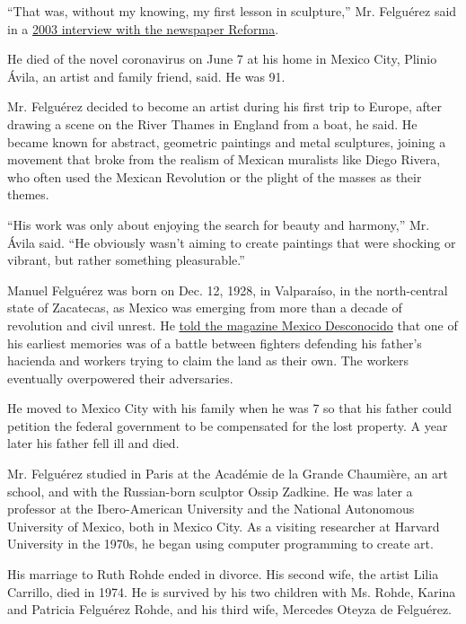 ``That was, without my knowing, my first lesson in sculpture,'' Mr.
Felguérez said in a
\href{https://reforma.vlex.com.mx/vid/manuel-felguerez-contrapesos-tension-82014611}{2003
interview with the newspaper Reforma}.

He died of the novel coronavirus on June 7 at his home in Mexico City,
Plinio Ávila, an artist and family friend, said. He was 91.

Mr. Felguérez decided to become an artist during his first trip to
Europe, after drawing a scene on the River Thames in England from a
boat, he said. He became known for abstract, geometric paintings and
metal sculptures, joining a movement that broke from the realism of
Mexican muralists like Diego Rivera, who often used the Mexican
Revolution or the plight of the masses as their themes.

``His work was only about enjoying the search for beauty and harmony,''
Mr. Ávila said. ``He obviously wasn't aiming to create paintings that
were shocking or vibrant, but rather something pleasurable.''

Manuel Felguérez was born on Dec. 12, 1928, in Valparaíso, in the
north-central state of Zacatecas, as Mexico was emerging from more than
a decade of revolution and civil unrest. He
\href{https://www.mexicodesconocido.com.mx/manuel-felguerez-y-el-museo-arte-abstracto.html}{told
the magazine Mexico Desconocido} that one of his earliest memories was
of a battle between fighters defending his father's hacienda and workers
trying to claim the land as their own. The workers eventually
overpowered their adversaries.

He moved to Mexico City with his family when he was 7 so that his father
could petition the federal government to be compensated for the lost
property. A year later his father fell ill and died.

Mr. Felguérez studied in Paris at the Académie de la Grande Chaumière,
an art school, and with the Russian-born sculptor Ossip Zadkine. He was
later a professor at the Ibero-American University and the National
Autonomous University of Mexico, both in Mexico City. As a visiting
researcher at Harvard University in the 1970s, he began using computer
programming to create art.

His marriage to Ruth Rohde ended in divorce. His second wife, the artist
Lilia Carrillo, died in 1974. He is survived by his two children with
Ms. Rohde, Karina and Patricia Felguérez Rohde, and his third wife,
Mercedes Oteyza de Felguérez.

